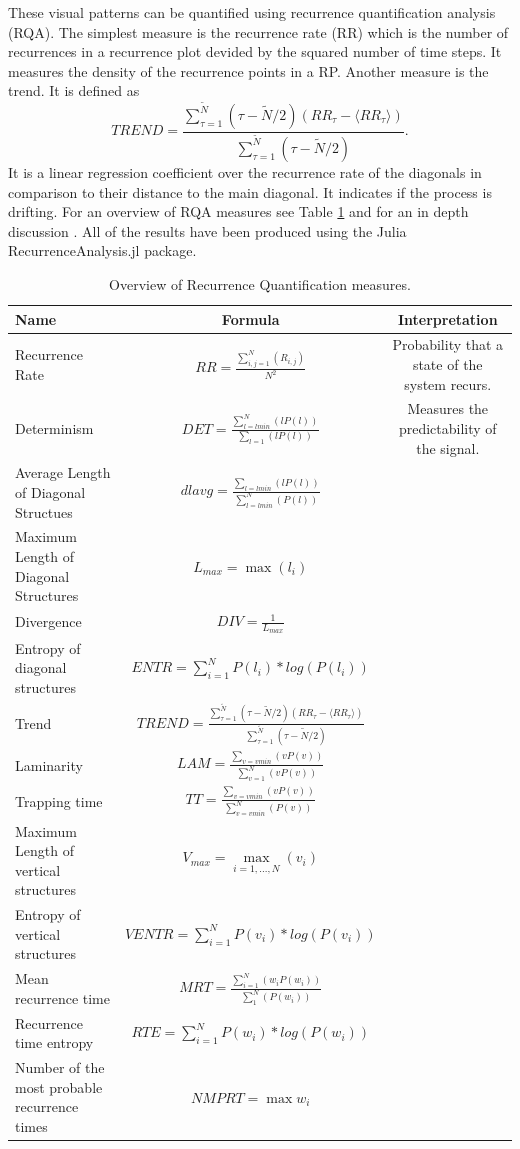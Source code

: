 \documentclass{article}
\begin{document}
These visual patterns can be quantified using recurrence quantification analysis (RQA)\cite{Zbilut}.
The simplest measure is the recurrence rate (RR) which is the number of recurrences in a recurrence plot devided by the squared number of time steps.
It measures the density of the recurrence points in a RP.
Another measure is the trend.
It is defined as
$$ TREND= \frac{\sum_{\tau=1}^{\tilde{N}}(\tau - \tilde{N}/2)(RR_\tau - \langle RR_\tau \rangle)}{\sum_{\tau=1}^{\tilde{N}}(\tau - \tilde{N}/2)}.$$
It is a linear regression coefficient over the recurrence rate of the diagonals in comparison to their distance to the main diagonal.
It indicates if the process is drifting.
For an overview of RQA measures see  Table \ref{RQA_table} and for an in depth discussion \cite{Marwan06}.
All of the results have been produced using the Julia \mbox{RecurrenceAnalysis.jl} package\cite{RQA.jl}.


\begin{landscape}
\renewcommand{\arraystretch}{2}
\begin{table}[]
\begin{tabular}{@{}lcc@{}}
\toprule
 Name & Formula & Interpretation \\
 \midrule
 Recurrence Rate & $ RR= \frac{\sum\limits_{i,j=1}^N(R_{i,j})}{N^2} $ & Probability that a state of the system recurs.  \\
 Determinism & $DET=\frac{\sum\limits_{l=lmin}^N(l P(l))}{\sum_{l=1}(l P(l))} $ & Measures the predictability of the signal.   \\
 Average Length of Diagonal Structues & $dlavg=\frac{\sum_{l=lmin}(l P(l))}{\sum_{l=lmin}^{N}(P(l))}$  &  \\
 Maximum Length of Diagonal Structures & $L_{max}=\max(l_i)$ &  \\
 Divergence & $DIV=\frac{1}{L_{max}}$ &  \\
 Entropy of diagonal structures & $ENTR=\sum\limits_{i=1}^N P(l_i) * log(P(l_i))$ &  \\
 Trend & $ TREND=\frac{\sum_{\tau=1}^{\tilde{N}}(\tau - \tilde{N}/2)(RR_\tau - \langle RR_\tau \rangle)}{\sum_{\tau=1}^{\tilde{N}}(\tau - \tilde{N}/2)}$ &  \\
 Laminarity & $LAM=\frac{\sum_{v=vmin}(v P(v))}{\sum_{v=1}^{N}(v P(v))}$ &  \\
 Trapping time & $TT=\frac{\sum_{v=vmin}(v P(v))}{\sum_{v=vmin}^{N}(P(v))}$ &  \\
 Maximum Length of vertical structures & $V_{max}=\max\limits_{i=1, ..., N}(v_i)$ &  \\
 Entropy of vertical structures& $VENTR=\sum\limits_{i=1}^N P(v_i) * log(P(v_i))$ &  \\
 Mean recurrence time & $MRT=\frac{\sum\limits_{i=1}^N(w_i P(w_i))}{\sum_{1}^{N}(P(w_i))}$  &  \\
 Recurrence time entropy & $RTE =\sum\limits_{i=1}^N P(w_i) * log(P(w_i))$  & \\
 Number of the most probable recurrence times & $NMPRT=\max w_i$ & \\ \bottomrule
\end{tabular}
\caption{Overview of Recurrence Quantification measures.}
\label{RQA_table}
\end{table}
\end{landscape}
\end{document}
